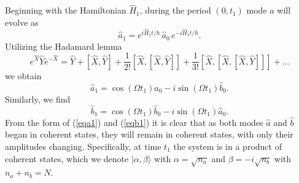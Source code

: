 \documentclass{iopart}
\begin{document}
Beginning with the Hamiltonian $\hat{H}_1$, during the period $(0, t_1)$ mode $\hat{a}$ will evolve as
\begin{equation}
\hat{a}_1 = e^{ i \hat{H}_1 t/ \hbar} \, \hat{a}_0 \, e^{-i \hat{H}_1 t/ \hbar}.
\end{equation}
Utilizing the Hadamard lemma
\begin{equation}
e^{\hat{X}} \hat{Y} e^{-\hat{X}} = \hat{Y} + [\hat{X},\hat{Y}] + \frac{1}{2!}[\hat{X},[\hat{X},\hat{Y}]] + \frac{1}{3!}[\hat{X},[\hat{X},[\hat{X},\hat{Y}]]] + \ldots
\label{eqHadamard}
\end{equation}
we obtain 
\begin{equation}
\hat{a}_1 =  \cos (\Omega t_1) \hat{a}_0 -i \sin (\Omega t_1) \hat{b}_0.
\label{eqa1}
\end{equation}
Similarly, we find
\begin{equation}
\hat{b}_1 = \cos (\Omega t_1) \hat{b}_0 - i \sin (\Omega t_1) \hat{a}_0.
\label{eqb1}
\end{equation}
From the form of (\ref{eqa1}) and (\ref{eqb1}) it is clear that as both modes $\hat{a}$ and $\hat{b}$ began in coherent states, they will remain in coherent states, with only their amplitudes changing. Specifically, at time $t_1$ the system is in a product of coherent states, which we denote $|\alpha, \beta\rangle$ with $\alpha=\sqrt{n_a}$ and $\beta=-i\sqrt{n_b}$ with $n_a + n_b = N$.
\end{document}
